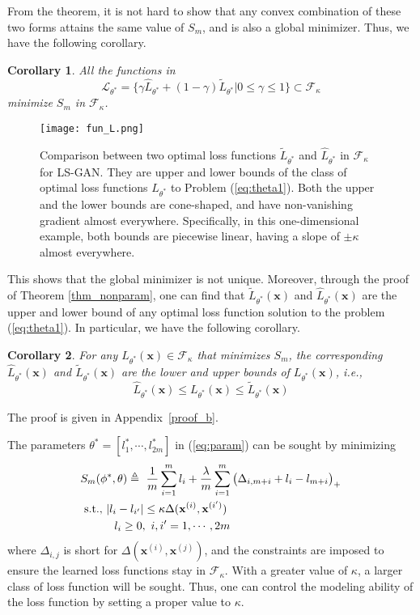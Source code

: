\documentclass[11pt,fullpage, letterpaper,twoside]{article}
\newtheorem{corollary}{Corollary}
\newcommand{\1}[1]{\mathds{1}_{\left[#1\right]}}
\begin{document}
From the theorem, it is not hard to show that any convex combination of these two forms attains the same value of $S_{m}$, and is also a global minimizer.  Thus, we have the following corollary.

\begin{corollary}
All the functions in
$$\mathcal L_{\theta^*}=\{\gamma \widehat L_{\theta^*} + (1-\gamma) \widetilde L_{\theta^*}|0\leq \gamma \leq 1\}\subset\mathcal F_\kappa$$
 minimize $S_{m}$ in $\mathcal F_\kappa$.
\end{corollary}

\begin{figure}[t!]
    \centering
        \texttt{[image: fun\_L.png]}
        \caption{Comparison between two optimal loss functions $\widetilde L_{\theta^*}$ and $\widehat L_{\theta^*}$ in $\mathcal F_\kappa$ for LS-GAN. They are upper and lower bounds of the class of optimal loss functions $L_{\theta^*}$ to Problem (\ref{eq:theta1}). Both the upper and the lower bounds are cone-shaped, and have non-vanishing gradient almost everywhere. Specifically,
        in this one-dimensional example, both bounds are piecewise linear, having a slope of $\pm\kappa$ almost everywhere.}\label{fig:fun_L}
\end{figure}

This shows that the global minimizer is not unique. Moreover, through the proof of Theorem \ref{thm_nonparam}, one can find that $\widetilde L_{\theta^*}(\mathbf x)$ and $\widehat L_{\theta^*}(\mathbf x)$ are the upper and lower bound of any optimal loss function solution to the problem (\ref{eq:theta1}). In particular, we have the following corollary.
\begin{corollary}\label{cor2}
For any $L_{\theta^*}(\mathbf x)\in\mathcal F_\kappa$ that minimizes $S_{m}$, the corresponding $\widehat L_{\theta^*}(\mathbf x)$ and $\widetilde L_{\theta^*}(\mathbf x)$ are the lower and upper bounds of $L_{\theta^*}(\mathbf x)$, i.e.,
$$
\widehat L_{\theta^*}(\mathbf x) \leq L_{\theta^*}(\mathbf x) \leq \widetilde L_{\theta^*}(\mathbf x)
$$
\end{corollary}
The proof is given in Appendix~\ref{proof_b}.


The parameters $\theta^*=[l_1^*,\cdots,l_{2m}^*]$ in (\ref{eq:param}) can be sought by minimizing
\begin{align}\label{eq:theta_param}
& S_{m} (\phi^*,\theta) \triangleq ~\dfrac{1}{m} \sum_{i=1}^m {l_i} + \dfrac{\lambda}{m} \sum_{i=1}^{m} \big( \Delta_{i,m+i}
+ l_i - l_{m+i} \big)_+\nonumber \\
&~{\rm s.t.,}~|l_i - l_{i'}| \leq \kappa\Delta(\mathbf x^{(i)},\mathbf x^{(i')})\nonumber\\
&~~~~~~~~~l_i\geq 0,~i,i'=1,\cdots,2m
\end{align}
where $\Delta_{i,j}$ is short for $\Delta(\mathbf x^{(i)},\mathbf x^{(j)})$, and the constraints are imposed to ensure the learned loss functions stay in $\mathcal F_\kappa$.
With a greater value of $\kappa$, a larger class of loss function will be sought.  Thus, one can control the modeling ability of the loss function by setting a proper value to $\kappa$.
\end{document}

